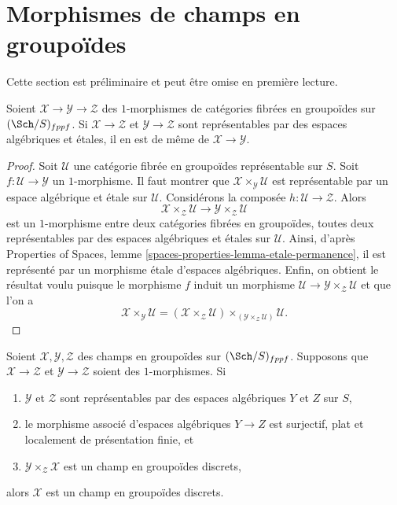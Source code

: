\section{Morphismes de champs en groupoïdes}
\label{section-1-morphisms}

\noindent
Cette section est préliminaire et peut être omise en première lecture.

\begin{lemma}
\label{lemma-etale-permanence}
Soient $\mathcal{X} \to \mathcal{Y} \to \mathcal{Z}$ des
$1$-morphismes de catégories fibrées en groupoïdes sur
$(\Sch/S)_{fppf}$.
Si $\mathcal{X} \to \mathcal{Z}$ et $\mathcal{Y} \to \mathcal{Z}$ sont
représentables par des espaces algébriques et étales, il en est de même de
$\mathcal{X} \to \mathcal{Y}$.
\end{lemma}

\begin{proof}
Soit $\mathcal{U}$ une catégorie fibrée en groupoïdes représentable sur $S$.
Soit $f : \mathcal{U} \to \mathcal{Y}$ un $1$-morphisme. Il faut montrer que
$\mathcal{X} \times_\mathcal{Y} \mathcal{U}$ est représentable par un
espace algébrique et étale sur $\mathcal{U}$.
Considérons la composée $h : \mathcal{U} \to \mathcal{Z}$. Alors
$$
\mathcal{X} \times_\mathcal{Z} \mathcal{U}
\longrightarrow
\mathcal{Y} \times_\mathcal{Z} \mathcal{U}
$$
est un $1$-morphisme entre deux catégories fibrées en groupoïdes, toutes deux
représentables par des espaces algébriques et étales sur $\mathcal{U}$.
Ainsi, d'après
Properties of Spaces, lemme \ref{spaces-properties-lemma-etale-permanence},
il est représenté par un morphisme étale d'espaces algébriques.
Enfin, on obtient le résultat voulu puisque le morphisme $f$ induit
un morphisme $\mathcal{U} \to \mathcal{Y} \times_\mathcal{Z} \mathcal{U}$
et que l'on a
$$
\mathcal{X} \times_\mathcal{Y} \mathcal{U} =
(\mathcal{X} \times_\mathcal{Z} \mathcal{U})
\times_{(\mathcal{Y} \times_\mathcal{Z} \mathcal{U})}
\mathcal{U}.
$$
\end{proof}

\begin{lemma}
\label{lemma-stack-in-setoids-descent}
Soient $\mathcal{X}, \mathcal{Y}, \mathcal{Z}$ des champs en groupoïdes
sur $(\Sch/S)_{fppf}$. Supposons que $\mathcal{X} \to \mathcal{Z}$
et $\mathcal{Y} \to \mathcal{Z}$ soient des $1$-morphismes.
Si
\begin{enumerate}
\item $\mathcal{Y}$ et $\mathcal{Z}$ sont représentables par des espaces algébriques
$Y$ et $Z$ sur $S$,
\item le morphisme associé d'espaces algébriques $Y \to Z$ est surjectif,
plat et localement de présentation finie, et
\item $\mathcal{Y} \times_\mathcal{Z} \mathcal{X}$ est un champ en
groupoïdes discrets,
\end{enumerate}
alors $\mathcal{X}$ est un champ en groupoïdes discrets.
\end{lemma}

